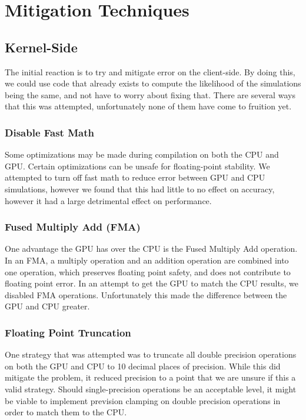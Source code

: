 \documentclass[fleqn,10pt]{SelfArx} %
\begin{document}
\section{Mitigation Techniques}
    \subsection{Kernel-Side}
        The initial reaction is to try and mitigate error on the client-side. By doing this, we could use code that already exists to compute the likelihood of the simulations being the same, and not have to worry about fixing that. There are several ways that this was attempted, unfortunately none of them have come to fruition yet.

        \subsubsection{Disable Fast Math}
            Some optimizations may be made during compilation on both the CPU and GPU. Certain optimizations can be unsafe for floating-point stability. We attempted to turn off fast math to reduce error between GPU and CPU simulations, however we found that this had little to no effect on accuracy, however it had a large detrimental effect on performance.
        
        \subsubsection{Fused Multiply Add (FMA)}
            One advantage the GPU has over the CPU is the Fused Multiply Add operation. In an FMA, a multiply operation and an addition operation are combined into one operation, which preserves floating point safety, and does not contribute to floating point error. In an attempt to get the GPU to match the CPU results, we disabled FMA operations. Unfortunately this made the difference between the GPU and CPU greater.


        \subsubsection{Floating Point Truncation}
            One strategy that was attempted was to truncate all double precision operations on both the GPU and CPU to 10 decimal places of precision. While this did mitigate the problem, it reduced precision to a point that we are unsure if this a valid strategy. Should single-precision operations be an acceptable level, it might be viable to implement prevision clamping on double precision operations in order to match them to the CPU.
\end{document}

